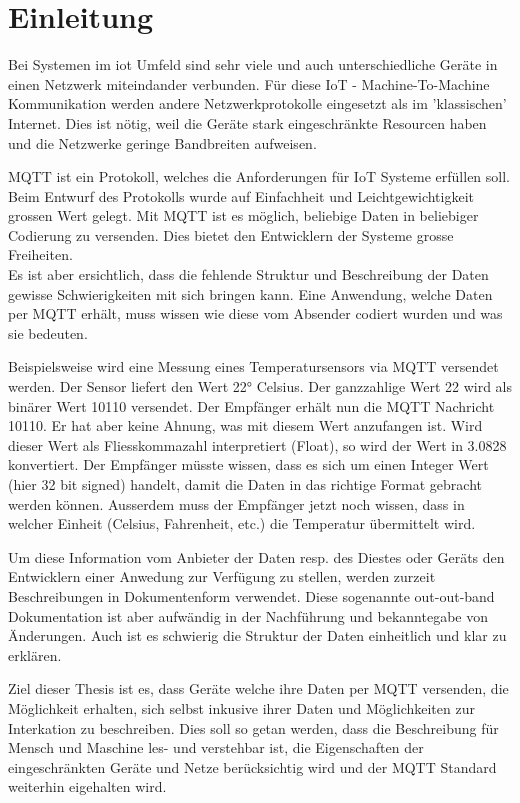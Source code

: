\chapter{Einleitung}
\label{chap:einleitung}

Bei Systemen im \acrfull{iot} Umfeld sind sehr viele und auch unterschiedliche Geräte in einen Netzwerk miteindander verbunden. 
Für diese IoT - Machine-To-Machine Kommunikation werden andere Netzwerkprotokolle eingesetzt als im 'klassischen' Internet. Dies ist nötig, weil die Geräte stark eingeschränkte Resourcen haben und die Netzwerke geringe Bandbreiten aufweisen.

MQTT ist ein Protokoll, welches die Anforderungen für IoT Systeme erfüllen soll. Beim Entwurf des Protokolls wurde auf Einfachheit und Leichtgewichtigkeit grossen Wert gelegt. Mit MQTT ist es möglich, beliebige Daten in beliebiger Codierung zu versenden. Dies bietet den Entwicklern der Systeme grosse Freiheiten. \\
Es ist aber ersichtlich, dass die fehlende Struktur und Beschreibung der Daten gewisse Schwierigkeiten mit sich bringen kann. Eine Anwendung, welche Daten per MQTT erhält, muss wissen wie diese vom Absender codiert wurden und was sie bedeuten.

Beispielsweise wird eine Messung eines Temperatursensors via MQTT versendet werden. Der Sensor liefert den Wert 22° Celsius.
Der ganzzahlige Wert 22 wird als binärer Wert 10110 versendet.
Der Empfänger erhält nun die MQTT Nachricht 10110. Er hat aber keine Ahnung, was mit diesem Wert anzufangen ist. Wird dieser Wert als Fliesskommazahl interpretiert (Float), so wird der Wert in 3.0828 konvertiert. Der Empfänger müsste wissen, dass es sich um einen Integer Wert (hier 32 bit signed) handelt, damit die Daten in das richtige Format gebracht werden können.
Ausserdem muss der Empfänger jetzt noch wissen, dass in welcher Einheit (Celsius, Fahrenheit, etc.) die Temperatur übermittelt wird.

Um diese Information vom Anbieter der Daten resp. des Diestes oder Geräts den Entwicklern einer Anwedung zur Verfügung zu stellen, werden zurzeit Beschreibungen in Dokumentenform verwendet. Diese sogenannte out-out-band Dokumentation ist aber aufwändig in der Nachführung und bekanntegabe von Änderungen. Auch ist es schwierig die Struktur der Daten einheitlich und klar zu erklären.

Ziel dieser Thesis ist es, dass Geräte welche ihre Daten per MQTT versenden, die Möglichkeit erhalten, sich selbst inkusive ihrer Daten und Möglichkeiten zur Interkation zu beschreiben. Dies soll so getan werden, dass die Beschreibung für Mensch und Maschine les- und verstehbar ist, die Eigenschaften der eingeschränkten Geräte und Netze berücksichtig wird und der MQTT Standard weiterhin eigehalten wird.


